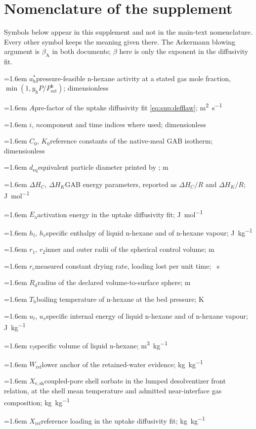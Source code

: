 \documentclass[11pt]{article}
\newcommand{\Tb}{T_{\mathrm{b}}}
\begin{document}
\section*{Nomenclature of the supplement}
\label{sec:si:nomenclature}
{\footnotesize
\setlength{\parindent}{0pt}
\newcommand{\nomitem}[2]{\par\hangindent=1.6em\hangafter=1 #1\enspace #2\par}
Symbols below appear in this supplement and not in the main-text nomenclature.
Every other symbol keeps the meaning given there. The Ackermann blowing
argument is $\beta_{\mathrm{A}}$ in both documents; $\beta$ here is only the
exponent in the diffusivity fit.

\nomitem{$a_{\mathrm{h}}^{*}$}{pressure-feasible n-hexane activity at a stated gas mole fraction, $\min(1,y_{\mathrm{h}}P/P_{\mathrm{sat}}^{\mathrm{h}})$; dimensionless}
\nomitem{$A$}{pre-factor of the uptake diffusivity fit \eqref{eq:sup:defflaw}; \si{\square\metre\per\second}}
\nomitem{$i$, $n$}{component and time indices where used; dimensionless}
\nomitem{$C_{0}$, $K_{0}$}{reference constants of the native-meal GAB isotherm; dimensionless}
\nomitem{$d_{\mathrm{eq}}$}{equivalent particle diameter printed by \citet{faner2008desolventizado}; \si{\metre}}
\nomitem{$\Delta H_{C}$, $\Delta H_{K}$}{GAB energy parameters, reported as $\Delta H_{C}/R$ and $\Delta H_{K}/R$; \si{\joule\per\mole}}
\nomitem{$E_{\mathrm{a}}$}{activation energy in the uptake diffusivity fit; \si{\joule\per\mole}}
\nomitem{$h_{l}$, $h_{v}$}{specific enthalpy of liquid n-hexane and of n-hexane vapour; \si{\joule\per\kilogram}}
\nomitem{$r_{1}$, $r_{2}$}{inner and outer radii of the spherical control volume; \si{\metre}}
\nomitem{$r_{\mathrm{c}}$}{measured constant drying rate, loading lost per unit time; \si{\per\second}}
\nomitem{$R_{\mathrm{d}}$}{radius of the declared volume-to-surface sphere; \si{\metre}}
\nomitem{$\Tb$}{boiling temperature of n-hexane at the bed pressure; \si{\kelvin}}
\nomitem{$u_{l}$, $u_{v}$}{specific internal energy of liquid n-hexane and of n-hexane vapour; \si{\joule\per\kilogram}}
\nomitem{$v_{l}$}{specific volume of liquid n-hexane; \si{\cubic\metre\per\kilogram}}
\nomitem{$W_{\mathrm{ref}}$}{lower anchor of the retained-water evidence; \si{\kilogram\per\kilogram}}
\nomitem{$X_{\mathrm{e,sh}}$}{coupled-pore shell sorbate in the lumped desolventizer front relation, at the shell mean temperature and admitted near-interface gas composition; \si{\kilogram\per\kilogram}}
\nomitem{$X_{\mathrm{ref}}$}{reference loading in the uptake diffusivity fit; \si{\kilogram\per\kilogram}}
}
\end{document}
